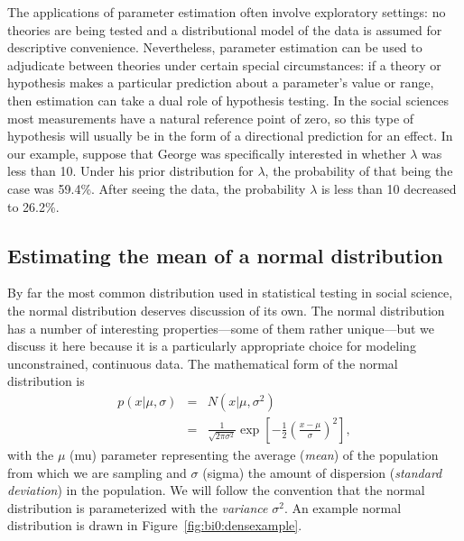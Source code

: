 The applications of parameter estimation often involve exploratory settings: no theories are being tested and a distributional model of the data is assumed for descriptive convenience.  Nevertheless, parameter estimation can be used to adjudicate between theories under certain special circumstances: if a theory or hypothesis makes a particular prediction about a parameter's value or range, then estimation can take a dual role of hypothesis testing. In the social sciences most measurements have a natural reference point of zero, so this type of hypothesis will usually be in the form of a directional prediction for an effect. In our example, suppose that George was specifically interested in whether $\lambda$ was less than 10.  Under his prior distribution for $\lambda$, the probability of that being the case was 59.4\%.  After seeing the data, the probability $\lambda$ is less than 10 decreased to 26.2\%.


\subsection{Estimating the mean of a normal distribution}
By far the most common distribution used in statistical testing in social science, the normal distribution deserves discussion of its own. The normal distribution has a number of interesting properties---some of them rather unique---but we discuss it here because it is a particularly appropriate choice for modeling unconstrained, continuous data.  The mathematical form of the normal distribution is
\begin{eqnarray*}
p(x|\mu,\sigma) &=& N(x|\mu,\sigma^2) \\
&=&\frac{1}{\sqrt{2\pi\sigma^2}}\exp\left[-\frac{1}{2}\left(\frac{x-\mu}{\sigma}\right)^2\right],
\end{eqnarray*}
with the $\mu$ (mu) parameter representing the average (\textit{mean}) of the population from which we are sampling and $\sigma$ (sigma) the amount of dispersion (\textit{standard deviation}) in the population. We will follow the convention that the normal distribution is parameterized with the \textit{variance} $\sigma^2$. An example normal distribution is drawn in Figure~\ref{fig:bi0:densexample}.

